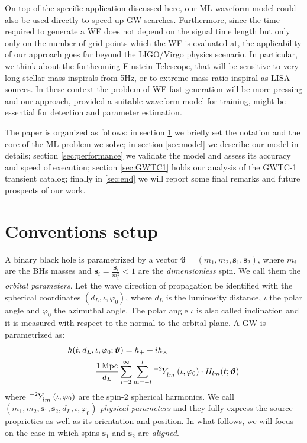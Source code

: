 On top of the specific application discussed here, our ML waveform model could also be used directly 
to speed up GW searches.
%
%
Furthermore, since the time required to generate a WF does not depend
on the signal time length but only only on the number of grid points which the WF is evaluated at,
the applicability of our approach goes far beyond the LIGO/Virgo physics scenario. In particular,
we think about the forthcoming Einstein Telescope, that will be sensitive to very long stellar-mass 
inspirals from 5Hz, or to extreme mass ratio inspiral as LISA sources. In these context the problem
of WF fast generation will be more pressing and our approach, provided a suitable waveform model 
for training,  might be essential for detection and parameter estimation. 

The paper is organized as follows:
in section \ref{sec:setup} we briefly set the notation and the core of the ML problem we solve; in section \ref{sec:model} we describe our model in details; section \ref{sec:performance} we validate the model and assess its accuracy and speed of execution; section \ref{sec:GWTC1} holds our analysis of the GWTC-1 transient catalog; finally in \ref{sec:end} we will report some final remarks and future prospects of our work.

\section{Conventions setup}
\label{sec:setup}
A binary black hole is parametrized by a vector $ \boldsymbol{\vartheta} = (m_1,m_2, \mathbf{s}_1,\mathbf{s}_2) $, where $m_i$ are the BHs masses and $\mathbf{s}_i = \frac{\mathbf{S}_i}{m_i^2} <1$ are the \textit{dimensionless} spin. 
We call them the \textit{orbital parameters}.
Let the wave direction of propagation be identified with the spherical coordinates $(d_L, \iota, \varphi_0)$, where $d_L$ is the luminosity distance, $\iota$ the polar angle and $\varphi_0$ the azimuthal angle. The polar angle $\iota$ is also called inclination and it is measured with respect to the normal to the orbital plane.
A GW is parametrized as:
\begin{align} \label{eq:h_parametrization}
	&h(t, d_L,\iota,\varphi_0; \boldsymbol{\vartheta}) = h_+ + i h_\times \nonumber \\
		&\qquad= {\frac{\SI{1}{Mpc}}{d_L}} \sum_{l = 2}^{\infty} \sum_{m = -l}^{l} \tensor[^{-2}]{Y}{_{l m}}(\iota, \varphi_0) \cdot H_{lm}(t; \boldsymbol{\vartheta})
\end{align}
where $\tensor[^{-2}]{Y}{_{l m}}(\iota, \varphi_0)$ are the spin-2 spherical harmonics.
We call $(m_1,m_2, \mathbf{s}_1,\mathbf{s}_2, d_L,\iota,\varphi_0)$ \textit{physical parameters} and they fully express the source 
proprieties as well as its orientation and position. In what follows, we will focus on the case in which 
spins $\mathbf{s}_1$ and $\mathbf{s}_2$ are \textit{aligned}. 

